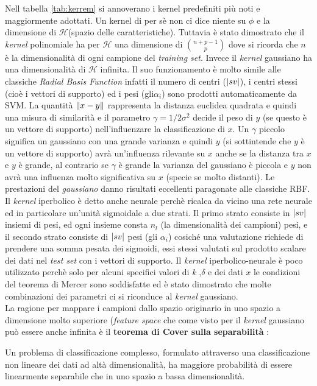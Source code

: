 Nell tabella \ref{tab:kerrem} si annoverano i kernel predefiniti più noti e maggiormente adottati. Un kernel di per sè non ci dice niente su $\phi$ e la dimensione di $\mathcal{H}$(spazio delle caratteristiche). Tuttavia è stato dimostrato che il \textit{kernel} polinomiale ha per  $\mathcal{H}$ una dimensione di $\binom{n+p-1}{p}$ dove si ricorda che $n$ è la dimensionalità di ogni campione del \textit{training set}. Invece il \textit{kernel} gaussiano ha una dimensionalità di $\mathcal{H}$ infinita. Il suo funzionamento è molto simile alle classiche \textit{Radial Basis Function} infatti  il numero di centri ($\lvert sv\rvert$), i centri stessi (cioè i vettori di supporto) ed i pesi (gli$ \alpha_i$) sono prodotti automaticamente da \ac{SVM}. La quantità $\lVert x-y\rVert$ rappresenta la distanza euclidea quadrata e quindi una misura di similarità e il parametro $\gamma = 1/2\sigma^2$ decide il peso di $y$ (se questo è un vettore di supporto) nell'influenzare la classificazione di $x$. Un $\gamma$ piccolo significa un gaussiano con una grande varianza e quindi $y$ (si sottintende che $y$ è un vettore di supporto) avrà un'influenza rilevante su $x$ anche se la distanza tra $x$ e $y$ è grande, al contrario se $\gamma$ è grande la varianza del gaussiano è piccola e $y$ non avrà una influenza molto significativa su $x$ (specie se molto distanti). Le prestazioni del \textit{gaussiano} danno risultati eccellenti paragonate alle classiche RBF.  Il \textit{kernel} iperbolico è detto anche neurale perchè ricalca da vicino una rete neurale ed in particolare un'unità sigmoidale a due strati. Il primo strato consiste in $\lvert sv\rvert$ insiemi di pesi, ed ogni insieme consta $n_l$ (la dimensionalità dei campioni) pesi, e il secondo strato consiste di $\lvert sv\rvert$ pesi (gli $\alpha_i$) cosiché una valutazione richiede di prendere una somma pesata dei sigmoidi, essi stessi valutati sul prodotto scalare dei dati nel \textit{test set} con i vettori di supporto. Il \textit{kernel} iperbolico-neurale è poco utilizzato perchè solo per alcuni specifici valori di {\footnotesize {\textsl k}} ,$\delta$ e dei dati $x$ le condizioni del teorema di Mercer sono soddisfatte ed è stato dimostrato che molte combinazioni dei parametri ci si riconduce al \textit{kernel} gaussiano.\\
La ragione per mappare i campioni dallo spazio originario in uno spazio a dimensione molto superiore (\textit{feature space} che come visto per il \textit{kernel} gaussiano può essere anche infinita è il \textbf{teorema di Cover sulla separabilità} \cite{Cover65}:
\begin{teorema}
\label{teo:Cover}
Un problema di classificazione complesso, formulato attraverso una classificazione non lineare dei dati ad altà dimensionalità, ha maggiore probabilità di essere linearmente separabile che in uno spazio a bassa dimensionalità.
\end{teorema}

